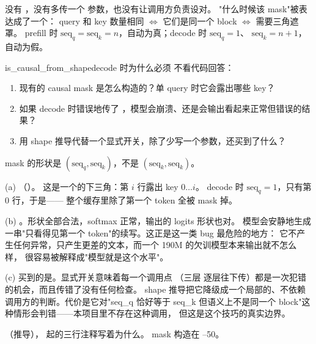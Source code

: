 没有 ，没有多传一个  参数，也没有让调用方负责设对。
"什么时候该 mask"被表达成了一个：
query 和 key 数量相同 $\Leftrightarrow$ 它们是同一个 block $\Leftrightarrow$ 需要三角遮罩。
prefill 时 $\text{seq}_q = \text{seq}_k = n$，自动为真；decode 时 $\text{seq}_q = 1$、
$\text{seq}_k = n{+}1$，自动为假。

\begin{checkpoint}{is_causal_from_shape}{decode 时为什么必须 }
不看代码回答：
\begin{enumerate}[label=(\alph*)]
  \item 现有的 causal mask 是怎么构造的？单 query 时它会露出哪些 key？
  \item 如果 decode 时错误地传了 ，模型会崩溃、还是会输出看起来正常但错误的结果？
  \item 用 shape 推导代替一个显式开关，除了少写一个参数，还买到了什么？
\end{enumerate}
\hint mask 的形状是 $(\text{seq}_q, \text{seq}_k)$，不是 $(\text{seq}_k, \text{seq}_k)$。

\ifshowanswers
\tcblower
\answer (a) 
（）。
这是一个的下三角：第 $i$ 行露出 key $0 \ldots i$。
decode 时 $\text{seq}_q = 1$，只有第 0 行，于是——
整个缓存里除了第一个 token 全被 mask 掉。

(b) 。形状全部合法，softmax 正常，输出的 logits 形状也对。
模型会安静地生成一串"只看得见第一个 token"的续写。这正是这一类 bug 最危险的地方：
它不产生任何异常，只产生更差的文本，而一个 190M 的欠训模型本来输出就不怎么样，
很容易被解释成"模型就是这个水平"。

(c) 买到的是。显式开关意味着每一个调用点
（三层  逐层往下传）都是一次犯错的机会，而且传错了没有任何检查。
shape 推导把它降级成一个局部的、不依赖调用方的判断。代价是它对"seq\_q 恰好等于 seq\_k
但语义上不是同一个 block"这种情形会判错——本项目里不存在这种调用，
但这是这个技巧的真实边界。

\whereincode {}（推导），
 起的三行注释写着为什么。
mask 构造在 --50。
\fi
\end{checkpoint}

